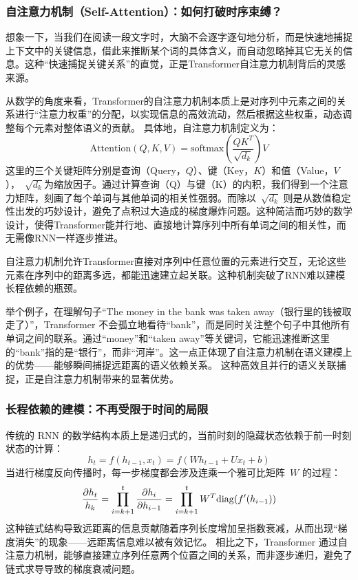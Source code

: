   \subsubsection*{  自注意力机制（Self-Attention）：如何打破时序束缚？}
想象一下，当我们在阅读一段文字时，大脑不会逐字逐句地分析，而是快速地捕捉上下文中的关键信息，借此来推断某个词的具体含义，而自动忽略掉其它无关的信息。这种“快速捕捉关键关系”的直觉，正是Transformer自注意力机制背后的灵感来源。
 
 从数学的角度来看，Transformer的自注意力机制本质上是对序列中元素之间的关系进行“注意力权重”的分配，以实现信息的高效流动，然后根据这些权重，动态调整每个元素对整体语义的贡献。
 具体地，自注意力机制定义为：
   \[
  \text{Attention}(Q, K, V) = \text{softmax} \left( \frac{QK^T}{\sqrt{d_k}} \right) V
  \]
  这里的三个关键矩阵分别是查询（Query，$Q$）、键（Key，$K$）和值（Value，$V$），~$\sqrt{d_k}$为缩放因子。通过计算查询（Q）与键（K）的内积，我们得到一个注意力矩阵，刻画了每个单词与其他单词的相关性强弱。而除以~$\sqrt{d_k}$ 则是从数值稳定性出发的巧妙设计，避免了点积过大造成的梯度爆炸问题。这种简洁而巧妙的数学设计，使得Transformer能并行地、直接地计算序列中所有单词之间的相关性，而无需像RNN一样逐步推进。

自注意力机制允许Transformer直接对序列中任意位置的元素进行交互，无论这些元素在序列中的距离多远，都能迅速建立起关联。这种机制突破了RNN难以建模长程依赖的瓶颈。

举个例子，在理解句子“The money in the bank was taken away（银行里的钱被取走了）”，Transformer 不会孤立地看待“bank”，而是同时关注整个句子中其他所有单词之间的联系。通过“money”和“taken away”等关键词，它能迅速推断这里的“bank”指的是“银行”，而非“河岸”。这一点正体现了自注意力机制在语义建模上的优势——能够瞬间捕捉远距离的语义依赖关系。
这种高效且并行的语义关联捕捉，正是自注意力机制带来的显著优势。

  \subsubsection*{ 长程依赖的建模：不再受限于时间的局限 }
 传统的 RNN 的数学结构本质上是递归式的，当前时刻的隐藏状态依赖于前一时刻状态的计算：
  $$ 
 h_t = f\left ( h_{t-1} , x_t \right)=  f\left ( Wh_{t-1} +U x_t +b \right)
 $$
 当进行梯度反向传播时，每一步梯度都会涉及连乘一个雅可比矩阵~$W$ 的过程：
 $$
\frac{ \partial h_t }{h_k}= \prod_{i=k+1}^t \frac{\partial h_i}{\partial h_{i-1}} =\prod_{i=k+1}^t W^T {\rm diag}( f^\prime(h_{i-1}))
 $$
这种链式结构导致远距离的信息贡献随着序列长度增加呈指数衰减，从而出现“梯度消失”的现象——远距离信息难以被有效记忆。
相比之下，Transformer 通过自注意力机制，能够直接建立序列任意两个位置之间的关系，而非逐步递归，避免了链式求导导致的梯度衰减问题。

